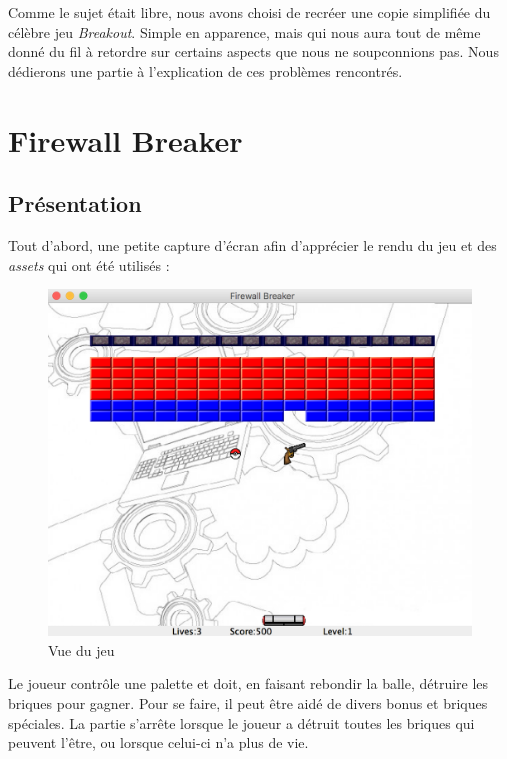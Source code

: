 \documentclass[a4paper,10pt]{article}
\begin{document}
Comme le sujet était libre, nous avons choisi de recréer une copie simplifiée du célèbre jeu \textit{Breakout}.
Simple en apparence, mais qui nous aura tout de même donné du fil à retordre sur certains aspects
que nous ne soupconnions pas. Nous dédierons une partie à l'explication de ces problèmes rencontrés.


\section{Firewall Breaker}
\subsection{Présentation}
    Tout d'abord, une petite capture d'écran afin d'apprécier le rendu du jeu et des \textit{assets} qui ont été
    utilisés  :

\FloatBarrier
		\begin{figure}[!h]
    		\begin{center}
	   	  	\includegraphics[scale= 0.5]{images/gameView.png}
          	\caption{Vue du jeu}
    		\end{center}
		\end{figure}
\FloatBarrier

Le joueur contrôle une palette et doit, en faisant rebondir la balle, détruire les briques pour gagner.
Pour se faire, il peut être aidé de divers bonus et briques spéciales. La partie s'arrête lorsque le joueur
a détruit toutes les briques qui peuvent l'être, ou lorsque celui-ci n'a plus de vie.
\end{document}
